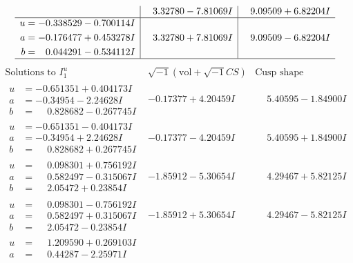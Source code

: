 \documentclass[1p]{elsarticle_modified}
\theoremstyle{definition}
\newcommand{\I}{\sqrt{-1}}
\begin{document}
$$\begin{array}{c|c|c}
 & \phantom{-}3.32780 - 7.81069 I & \phantom{-}9.09509 + 6.82204 I \\ \hline\begin{aligned}
u &= -0.338529 - 0.700114 I \\
a &= -0.176477 + 0.453278 I \\
b &= \phantom{-}0.044291 - 0.534112 I\end{aligned}
 & \phantom{-}3.32780 + 7.81069 I & \phantom{-}9.09509 - 6.82204 I\\
 \hline 
 \end{array}$$\newpage$$\begin{array}{c|c|c}  
\text{Solutions to }I^u_{1}& \I (\text{vol} + \sqrt{-1}CS) & \text{Cusp shape}\\
 \hline 
\begin{aligned}
u &= -0.651351 + 0.404173 I \\
a &= -0.34954 - 2.24628 I \\
b &= \phantom{-}0.828682 - 0.267745 I\end{aligned}
 & -0.17377 + 4.20459 I & \phantom{-}5.40595 - 1.84900 I \\ \hline\begin{aligned}
u &= -0.651351 - 0.404173 I \\
a &= -0.34954 + 2.24628 I \\
b &= \phantom{-}0.828682 + 0.267745 I\end{aligned}
 & -0.17377 - 4.20459 I & \phantom{-}5.40595 + 1.84900 I \\ \hline\begin{aligned}
u &= \phantom{-}0.098301 + 0.756192 I \\
a &= \phantom{-}0.582497 - 0.315067 I \\
b &= \phantom{-}2.05472 + 0.23854 I\end{aligned}
 & -1.85912 - 5.30654 I & \phantom{-}4.29467 + 5.82125 I \\ \hline\begin{aligned}
u &= \phantom{-}0.098301 - 0.756192 I \\
a &= \phantom{-}0.582497 + 0.315067 I \\
b &= \phantom{-}2.05472 - 0.23854 I\end{aligned}
 & -1.85912 + 5.30654 I & \phantom{-}4.29467 - 5.82125 I \\ \hline\begin{aligned}
u &= \phantom{-}1.209590 + 0.269103 I \\
a &= \phantom{-}0.44287 - 2.25971 I \\

\end{aligned}
\end{array}$$
\end{document}
